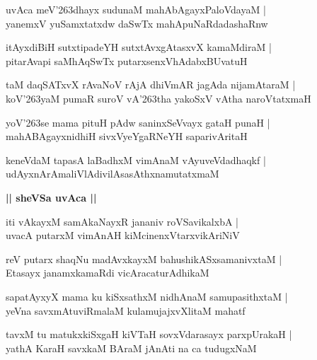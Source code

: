 \documentclass[twoside,12pt,openright]{book}
\def\S{\char'263}
\newcounter{shloka}[chapter]
\def\uvaca#1{\centerline{{\large\textbf{#1}}}}
\begin{document}
\begin{shloka}%
uvAca meV\S dhayx sudunaM mahAbAgayxPaloVdayaM |\\
yanemxV yuSamxtatxdw daSwTx mahApuNaRdadashaRnw
\end{shloka}

\begin{shloka}%
itAyxdiBiH sutxtipadeYH sutxtAvxgAtasxvX kamaMdiraM |\\
pitarAvapi saMhAqSwTx putarxsenxVhAdabxBUvatuH 
\end{shloka}

\begin{shloka}%
taM daqSATxvX rAvaNoV rAjA dhiVmAR jagAda nijamAtaraM |\\
koV\S yaM pumaR suroV vA\S tha yakoSxV vAtha naroVtatxmaH
\end{shloka}

\begin{shloka}%
yoV\S se mama pituH pAdw saninxSeVvayx gataH punaH |\\
mahABAgayxnidhiH sivxVyeYgaRNeYH saparivAritaH
\end{shloka}

\begin{shloka}%
keneVdaM tapasA laBadhxM vimAnaM vAyuveVdadhaqkf |\\
udAyxnArAmaliVlAdivilAsasAthxnamutatxmaM 
\end{shloka}

\uvaca{|| sheVSa uvAca ||}

\begin{shloka}%
iti vAkayxM samAkaNayxR jananiv roVSavikalxbA |\\
uvacA putarxM vimAnAH kiMcinenxVtarxvikAriNiV 
\end{shloka}

\begin{shloka}%
reV putarx shaqNu madAvxkayxM bahushikASxsamanivxtaM |\\
Etasayx janamxkamaRdi vicAracaturAdhikaM 
\end{shloka}

\begin{shloka}%
sapatAyxyX mama ku kiSxsathxM nidhAnaM samupasithxtaM |\\
yeVna savxmAtuviRmalaM kulamujajxvXlitaM mahatf
\end{shloka}

\begin{shloka}%
tavxM tu matukxkiSxgaH kiVTaH sovxVdarasayx parxpUrakaH |\\
yathA KaraH savxkaM BAraM jAnAti na ca tudugxNaM 
\end{shloka}
\end{document}
